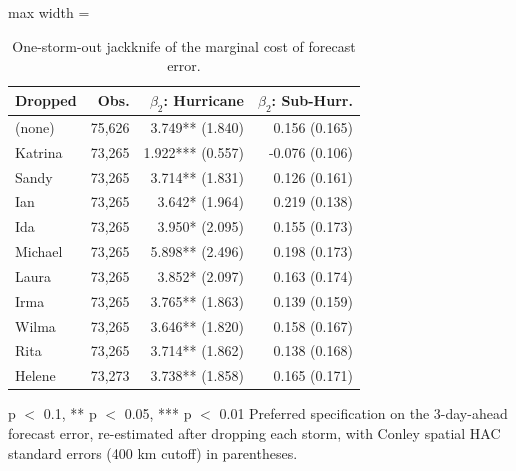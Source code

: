 \begin{table}

\caption{One-storm-out jackknife of the marginal cost of forecast error. \label{tab:cost_jackknife}}
\centering
\begin{adjustbox}{max width = \textwidth}
\begin{threeparttable}
\begin{tabular}[t]{lrrr}
\toprule
Dropped & Obs. & $\beta_2$: Hurricane & $\beta_2$: Sub-Hurr.\\
\midrule
(none) & 75,626 & 3.749** (1.840) & 0.156 (0.165)\\
Katrina & 73,265 & 1.922*** (0.557) & -0.076 (0.106)\\
Sandy & 73,265 & 3.714** (1.831) & 0.126 (0.161)\\
Ian & 73,265 & 3.642* (1.964) & 0.219 (0.138)\\
Ida & 73,265 & 3.950* (2.095) & 0.155 (0.173)\\
Michael & 73,265 & 5.898** (2.496) & 0.198 (0.173)\\
Laura & 73,265 & 3.852* (2.097) & 0.163 (0.174)\\
Irma & 73,265 & 3.765** (1.863) & 0.139 (0.159)\\
Wilma & 73,265 & 3.646** (1.820) & 0.158 (0.167)\\
Rita & 73,265 & 3.714** (1.862) & 0.138 (0.168)\\
Helene & 73,273 & 3.738** (1.858) & 0.165 (0.171)\\
\bottomrule
\end{tabular}
\begin{tablenotes}
\small
\item * p $<$ 0.1, ** p $<$ 0.05, *** p $<$ 0.01 Preferred specification on the 3-day-ahead forecast error, re-estimated after dropping each storm, with Conley spatial HAC standard errors (400 km cutoff) in parentheses.
\end{tablenotes}
\end{threeparttable}
\end{adjustbox}
\end{table}
